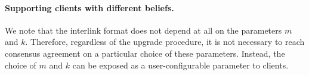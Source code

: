 \paragraph{Supporting clients with different beliefs.}
We note that the interlink format does not depend at all on the parameters $m$ and $k$.
Therefore, regardless of the upgrade procedure, it is not necessary to reach consensus agreement on a particular choice of these parameters. Instead, the choice of $m$ and $k$ can be exposed as a user-configurable parameter to clients.

